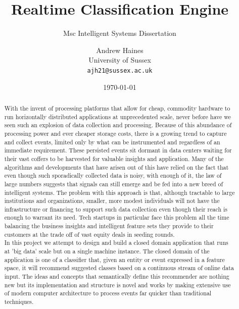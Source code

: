 \documentclass[a4paper,11pt]{scrreprt}
\begin{document}
\title{Realtime Classification Engine}
\subtitle{Msc Intelligent Systems Dissertation}
\author{Andrew Haines\\
	University of Sussex\\
	\texttt{ajh21@sussex.ac.uk}}

\date{\today}
\maketitle

\begin{abstract}
With the invent of processing platforms that allow for cheap, commodity hardware to run horizontally distributed applications at unprecedented scale, never before have we seen such an explosion of data collection and processing. Because of this abundance of processing power and ever cheaper storage costs, there is a growing trend to capture and collect events, limited only by what can be instrumented and regardless of an immediate requirement. These persisted events sit dormant in data centers waiting for their vast coffers to be harvested for valuable insights and application. Many of the algorithms and developments that have arisen out of this have relied on the fact that even though such sporadically collected data is noisy, with enough of it, the law of large numbers suggests that signals can still emerge and be fed into a new breed of intelligent systems\cite{bigdata}. The problem with this approach is that, although tractable to large institutions and organizations, smaller, more modest individuals will not have the infrastructure or financing to support such data collection even though their reach is enough to warrant its need. Tech startups in particular face this problem all the time balancing the business insights and intelligent feature sets they provide to their customers at the trade off of vast equity deals in seeding rounds.\\

In this project we attempt to design and build a closed domain application that runs at 'big data' scale but on a single machine instance. The closed domain of the application is one of a classifier that, given an entity or event expressed in a feature space, it will recommend suggested classes based on a continuous stream of online data input. The ideas and concepts that semantically define this recommender are nothing new but its implementation and structure is novel and works by making extensive use of modern computer architecture to process events far quicker than traditional techniques.

\end{abstract}
\end{document}
